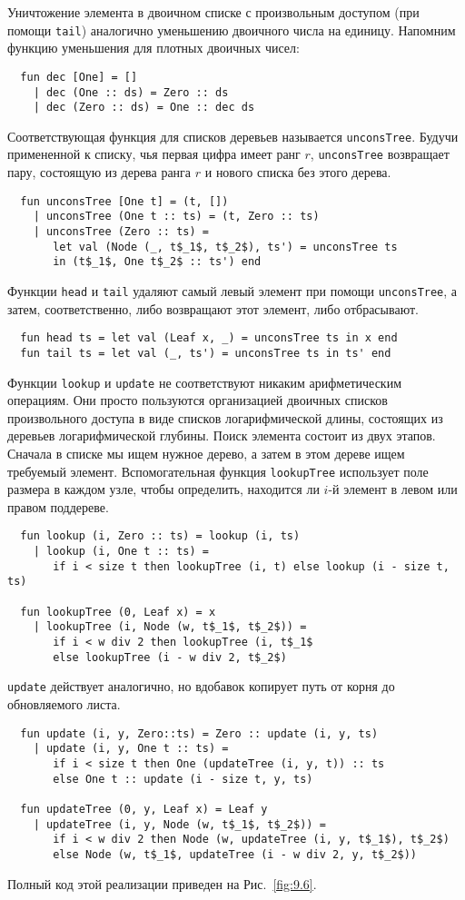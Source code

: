 Уничтожение элемента в двоичном списке с произвольным доступом (при
помощи \lstinline!tail!) аналогично уменьшению двоичного числа на
единицу. Напомним функцию уменьшения для плотных двоичных чисел:
\begin{lstlisting}
  fun dec [One] = []
    | dec (One :: ds) = Zero :: ds
    | dec (Zero :: ds) = One :: dec ds
\end{lstlisting}
Соответствующая функция для списков деревьев называется
\lstinline!unconsTree!. Будучи примененной к списку, чья первая цифра
имеет ранг $r$, \lstinline!unconsTree! возвращает пару, состоящую из
дерева ранга $r$ и нового списка без этого дерева.
\begin{lstlisting}
  fun unconsTree [One t] = (t, [])
    | unconsTree (One t :: ts) = (t, Zero :: ts)
    | unconsTree (Zero :: ts) =
       let val (Node (_, t$_1$, t$_2$), ts') = unconsTree ts
       in (t$_1$, One t$_2$ :: ts') end
\end{lstlisting}
Функции \lstinline!head! и \lstinline!tail!  удаляют самый левый
элемент при помощи \lstinline!unconsTree!, а затем, соответственно,
либо возвращают этот элемент, либо отбрасывают.
\begin{lstlisting}
  fun head ts = let val (Leaf x, _) = unconsTree ts in x end
  fun tail ts = let val (_, ts') = unconsTree ts in ts' end
\end{lstlisting}

Функции \lstinline!lookup! и \lstinline!update! не соответствуют
никаким арифметическим операциям. Они просто пользуются организацией
двоичных списков произвольного доступа в виде списков логарифмической
длины, состоящих из деревьев логарифмической глубины. Поиск элемента
состоит из двух этапов. Сначала в списке мы ищем нужное дерево, а
затем в этом дереве ищем требуемый элемент. Вспомогательная функция
\lstinline!lookupTree! использует поле размера в каждом узле, чтобы
определить, находится ли $i$-й элемент в левом или правом
поддереве.
\begin{lstlisting}
  fun lookup (i, Zero :: ts) = lookup (i, ts)
    | lookup (i, One t :: ts) =
       if i < size t then lookupTree (i, t) else lookup (i - size t, ts)

  fun lookupTree (0, Leaf x) = x
    | lookupTree (i, Node (w, t$_1$, t$_2$)) =
       if i < w div 2 then lookupTree (i, t$_1$
       else lookupTree (i - w div 2, t$_2$)
\end{lstlisting}
\lstinline!update! действует аналогично, но вдобавок копирует путь от
корня до обновляемого листа.
\begin{lstlisting}
  fun update (i, y, Zero::ts) = Zero :: update (i, y, ts)
    | update (i, y, One t :: ts) =
       if i < size t then One (updateTree (i, y, t)) :: ts
       else One t :: update (i - size t, y, ts)

  fun updateTree (0, y, Leaf x) = Leaf y
    | updateTree (i, y, Node (w, t$_1$, t$_2$)) =
       if i < w div 2 then Node (w, updateTree (i, y, t$_1$), t$_2$)
       else Node (w, t$_1$, updateTree (i - w div 2, y, t$_2$))
\end{lstlisting}
Полный код этой реализации приведен на Рис.~\ref{fig:9.6}.

